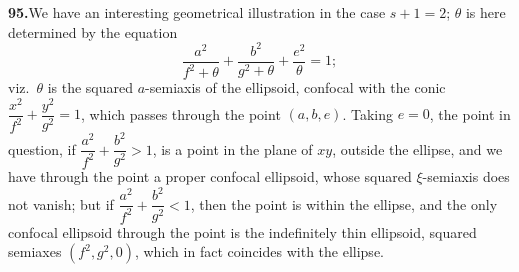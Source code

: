 \documentclass[11pt]{article}
\begin{document}
\noindent\textbf{95.}\quad We have an interesting geometrical illustration in the case $s+1=2$; $\theta$ is here determined by the equation
\[
\frac{a^{2}}{f^{2}+\theta} + \frac{b^{2}}{g^{2}+\theta} + \frac{e^{2}}{\theta} = 1;
\]
viz.\ $\theta$ is the squared $a$-semiaxis of the ellipsoid, confocal with the conic $\dfrac{x^{2}}{f^{2}}+\dfrac{y^{2}}{g^{2}}=1$, which passes through the point $(a,b,e)$. Taking $e=0$, the point in question, if $\dfrac{a^{2}}{f^{2}}+\dfrac{b^{2}}{g^{2}}>1$, is a point in the plane of $xy$, outside the ellipse, and we have through the point a proper confocal ellipsoid, whose squared $\xi$-semiaxis does not vanish; but if $\dfrac{a^{2}}{f^{2}}+\dfrac{b^{2}}{g^{2}}<1$, then the point is within the ellipse, and the only confocal ellipsoid through the point is the indefinitely thin ellipsoid, squared semiaxes $(f^{2},g^{2},0)$, which in fact coincides with the ellipse.
\end{document}
